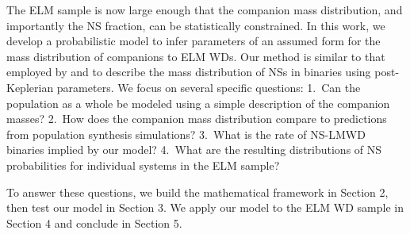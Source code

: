 \documentclass[apjl]{emulateapj}
\begin{document}
The ELM sample is now large enough that the companion mass distribution, and importantly the NS fraction, can be statistically constrained. 
In this work, we develop a probabilistic model to infer parameters of an assumed form for the mass distribution of companions to ELM WDs. Our method is similar to that employed by \citet{ozel12} and \citet{kiziltan13} to describe the mass distribution of NSs in binaries using post-Keplerian parameters. We focus on several specific questions: 1.\ Can the population as a whole be modeled using a simple description of the companion masses? 2.\ How does the companion mass distribution compare to predictions from population synthesis simulations?  3.\ What is the rate of NS-LMWD binaries implied by our model? 4.\ What are the resulting distributions of NS probabilities for individual systems in the ELM sample? 


To answer these questions, we build the mathematical framework in Section 2, then test our model in Section 3. We apply our model to the ELM WD sample in Section 4 and conclude in Section 5.
\end{document}

